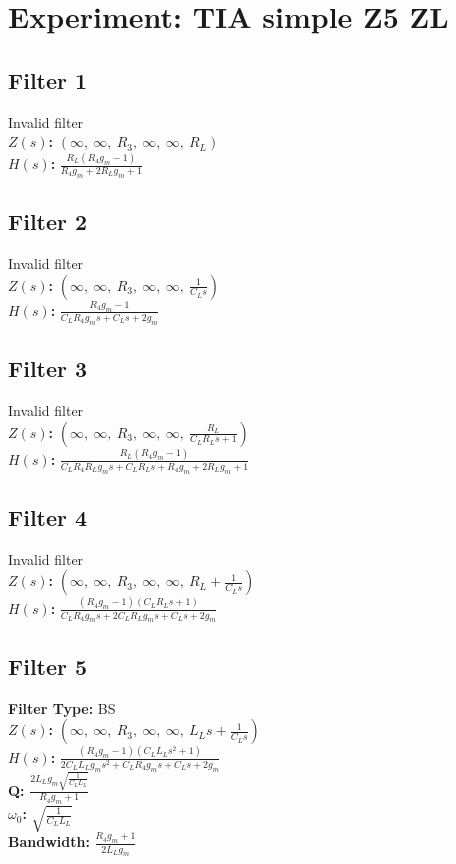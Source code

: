 \documentclass{article}
\begin{document}
        \section*{Experiment: TIA simple Z5 ZL}
\subsection*{Filter 1}
Invalid filter \\ 
\textbf{$Z(s)$:} $\left( \infty, \  \infty, \  R_{3}, \  \infty, \  \infty, \  R_{L}\right)$ \\ 
\textbf{$H(s)$:} $\frac{R_{L} \left(R_{4} g_{m} - 1\right)}{R_{4} g_{m} + 2 R_{L} g_{m} + 1}$ \\ 
\subsection*{Filter 2}
Invalid filter \\ 
\textbf{$Z(s)$:} $\left( \infty, \  \infty, \  R_{3}, \  \infty, \  \infty, \  \frac{1}{C_{L} s}\right)$ \\ 
\textbf{$H(s)$:} $\frac{R_{4} g_{m} - 1}{C_{L} R_{4} g_{m} s + C_{L} s + 2 g_{m}}$ \\ 
\subsection*{Filter 3}
Invalid filter \\ 
\textbf{$Z(s)$:} $\left( \infty, \  \infty, \  R_{3}, \  \infty, \  \infty, \  \frac{R_{L}}{C_{L} R_{L} s + 1}\right)$ \\ 
\textbf{$H(s)$:} $\frac{R_{L} \left(R_{4} g_{m} - 1\right)}{C_{L} R_{4} R_{L} g_{m} s + C_{L} R_{L} s + R_{4} g_{m} + 2 R_{L} g_{m} + 1}$ \\ 
\subsection*{Filter 4}
Invalid filter \\ 
\textbf{$Z(s)$:} $\left( \infty, \  \infty, \  R_{3}, \  \infty, \  \infty, \  R_{L} + \frac{1}{C_{L} s}\right)$ \\ 
\textbf{$H(s)$:} $\frac{\left(R_{4} g_{m} - 1\right) \left(C_{L} R_{L} s + 1\right)}{C_{L} R_{4} g_{m} s + 2 C_{L} R_{L} g_{m} s + C_{L} s + 2 g_{m}}$ \\ 
\subsection*{Filter 5}
\textbf{Filter Type:} BS \\ 
\textbf{$Z(s)$:} $\left( \infty, \  \infty, \  R_{3}, \  \infty, \  \infty, \  L_{L} s + \frac{1}{C_{L} s}\right)$ \\ 
\textbf{$H(s)$:} $\frac{\left(R_{4} g_{m} - 1\right) \left(C_{L} L_{L} s^{2} + 1\right)}{2 C_{L} L_{L} g_{m} s^{2} + C_{L} R_{4} g_{m} s + C_{L} s + 2 g_{m}}$ \\ 
\textbf{Q:} $\frac{2 L_{L} g_{m} \sqrt{\frac{1}{C_{L} L_{L}}}}{R_{4} g_{m} + 1}$ \\ 
\textbf{$\omega_0$:} $\sqrt{\frac{1}{C_{L} L_{L}}}$ \\ 
\textbf{Bandwidth:} $\frac{R_{4} g_{m} + 1}{2 L_{L} g_{m}}$ \\ 
\end{document}
